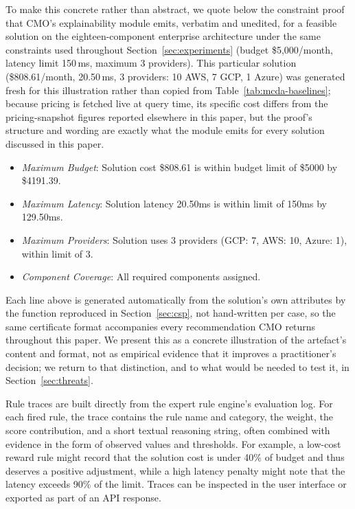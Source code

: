 \documentclass[journal]{IEEEtran}
\newcommand{\cmo}{CMO\xspace}
\begin{document}
To make this concrete rather than abstract, we quote below the constraint
proof that \cmo's explainability module emits, verbatim and unedited, for a
feasible solution on the eighteen-component enterprise architecture under the
same constraints used throughout Section~\ref{sec:experiments} (budget
\$5{,}000/month, latency limit 150\,ms, maximum 3 providers). This particular
solution (\$808.61/month, 20.50\,ms, 3 providers: 10 AWS, 7 GCP, 1 Azure) was
generated fresh for this illustration rather than copied from
Table~\ref{tab:mcda-baselines}; because pricing is fetched live at query
time, its specific cost differs from the pricing-snapshot figures reported
elsewhere in this paper, but the proof's structure and wording are exactly
what the module emits for every solution discussed in this paper.

\begin{itemize}
  \item \textit{Maximum Budget}: Solution cost \$808.61 is within budget limit of \$5000 by \$4191.39.
  \item \textit{Maximum Latency}: Solution latency 20.50ms is within limit of 150ms by 129.50ms.
  \item \textit{Maximum Providers}: Solution uses 3 providers (GCP: 7, AWS: 10, Azure: 1), within limit of 3.
  \item \textit{Component Coverage}: All required components assigned.
\end{itemize}

Each line above is generated automatically from the solution's own
attributes by the function reproduced in Section~\ref{sec:csp}, not
hand-written per case, so the same certificate format accompanies every
recommendation \cmo returns throughout this paper. We present this as a
concrete illustration of the artefact's content and format, not as empirical
evidence that it improves a practitioner's decision; we return to that
distinction, and to what would be needed to test it, in
Section~\ref{sec:threats}.

Rule traces are built directly from the expert rule engine's evaluation log.
For each fired rule, the trace contains the rule name and category, the weight,
the score contribution, and a short textual reasoning string, often combined
with evidence in the form of observed values and thresholds. For example, a
low-cost reward rule might record that the solution cost is under 40\% of
budget and thus deserves a positive adjustment, while a high latency penalty
might note that the latency exceeds 90\% of the limit. Traces can be inspected
in the user interface or exported as part of an API response.
\end{document}
